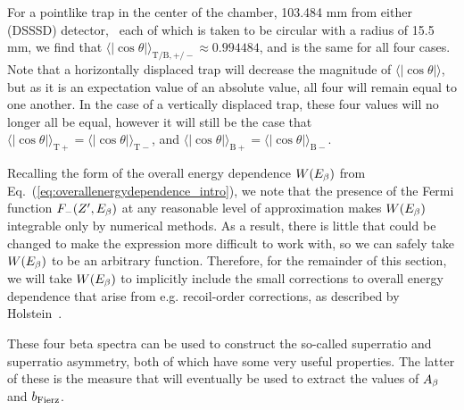 For a pointlike trap in the center of the chamber, 103.484 mm from either (DSSSD) detector,~ each of which is taken to be circular with a radius of 15.5 mm, we find that $\langle | \cos\theta | \rangle_{\mathrm T/ \mathrm B, +/-} \approx 0.994484$, and is the same for all four cases.
 Note that a horizontally displaced trap will decrease the magnitude of $\langle | \cos\theta | \rangle $, but as it is an expectation value of an absolute value, all four will remain equal to one another.  In the case of a vertically displaced trap, these four values will no longer all be equal, however it will still be the case that $\langle | \cos\theta | \rangle_{\mathrm T +} = \langle | \cos\theta | \rangle_{\mathrm T -}$, and $\langle | \cos\theta | \rangle_{\mathrm B+} = \langle | \cos\theta | \rangle_{\mathrm B -}$.  


Recalling the form of the overall energy dependence $W(E_{\beta})$ from Eq.~(\ref{eq:overallenergydependence_intro}), we note that the presence of the Fermi function $F_{-}(Z^\prime, E_\beta)$ at any reasonable level of approximation makes $W(E_{\beta})$ integrable only by numerical methods.  As a result, there is little that could be changed to make the expression more difficult to work with, so we can safely take $W(E_{\beta})$ to be an arbitrary function.  Therefore, for the remainder of this section, we will take $W(E_{\beta})$ to implicitly include the small corrections to overall energy dependence that arise from e.g.\! recoil-order corrections, as described by Holstein~\cite{holstein}.


These four beta spectra can be used to construct the so-called superratio and superratio asymmetry, both of which have some very useful properties.  The latter of these is the measure that will eventually be used to extract the values of $A_{\beta}$ and $b_{\mathrm{Fierz}}$.   

